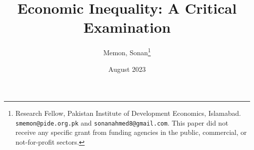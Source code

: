 \documentclass[12pt]{article}
\newcommand{\1}{\mathbbm 1}
\begin{document}
	
	
	
	
	
	
	\title{{Economic Inequality: A Critical Examination %
			}}
			
			\date{August 2023%
		}
		
		
		\author{Memon, Sonan\footnote{Research Fellow, Pakistan Institute of Development Economics, Islamabad. \texttt{smemon@pide.org.pk} and \texttt{sonanahmed8@gmail.com}. This paper did not receive any specific grant from funding agencies in the public, commercial, or not-for-profit sectors.}} 
		
		\maketitle
		
		\vspace{-2ex}
		
\end{document}
